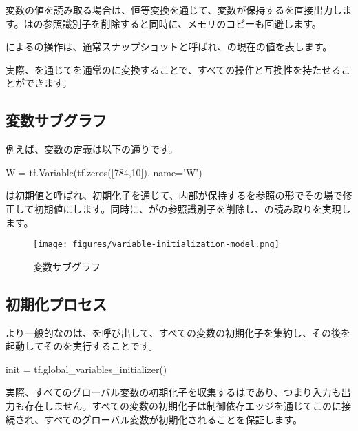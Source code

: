 \begin{content}
変数の値を読み取る場合は、恒等変換を通じて、変数が保持するを直接出力します。はの参照識別子を削除すると同時に、メモリのコピーも回避します。

によるの操作は、通常スナップショットと呼ばれ、の現在の値を表します。

実際、を通じてを通常のに変換することで、すべての操作と互換性を持たせることができます。

\subsection{変数サブグラフ}

例えば、変数の定義は以下の通りです。

\begin{leftbar}
\begin{python}
W = tf.Variable(tf.zeros([784,10]), name='W')
\end{python}
\end{leftbar}

は初期値と呼ばれ、初期化子を通じて、内部が保持するを参照の形でその場で修正して初期値にします。同時に、がの参照識別子を削除し、の読み取りを実現します。

\begin{figure}[!h]
\centering
\texttt{[image: figures/variable-initialization-model.png]}
\caption{変数サブグラフ}
 \label{fig:variable-initialization-model}
\end{figure}

\subsection{初期化プロセス}

より一般的なのは、を呼び出して、すべての変数の初期化子を集約し、その後を起動してそのを実行することです。

\begin{leftbar}
\begin{python}
init = tf.global_variables_initializer()
\end{python}
\end{leftbar}

実際、すべてのグローバル変数の初期化子を収集するはであり、つまり入力も出力も存在しません。すべての変数の初期化子は制御依存エッジを通じてこのに接続され、すべてのグローバル変数が初期化されることを保証します。


\end{content}
